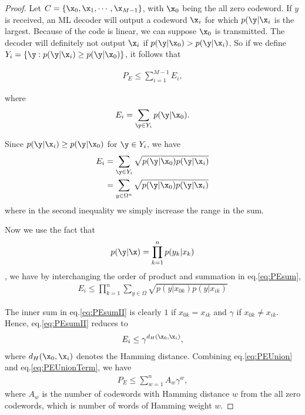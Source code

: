 \begin{proof}
    Let \(C=\{\x_0, \x_1, \cdots, \x_{M-1}\}\), with \(\x_0\) being the all zero codeword. If \(y\) is received, an ML decoder will output a codeword \(\x_i\) for which \(p(\y|\x_i\) is the largest. Because of the code is linear, we can suppose \(\x_0\) is transmitted. The decoder will definitely not output \(\x_i\) if \(p(\y|\x_0) > p(\y|\x_i)\). So if we define \(Y_i = \{\y: p(\y|\x_i) \geq p(\y|\x_0)\}\), it follows that 
    
    \begin{align}
        P_E \leq \sum_{i=1}^{M-1} E_i,
        \label{eq:PEUnion}
    \end{align}

    where 
    \begin{align*}
        E_i = \sum_{\y \in Y_i} p(\y|\x_0).   
    \end{align*}

    Since \(p(\y|\x_i) \geq p(\y|\x_0)\) for \(\y \in Y_i\), 
    we have
    \begin{align}
        E_i &= \sum_{\y \in Y_i} \sqrt{p(\y|\x_0)p(\y|\x_i)} \nonumber \\
        &= \sum_{y \in \Omega^n} \sqrt{p(\y|\x_0)p(\y|\x_i)}
        \label{eq:PEsum}
    \end{align}
    where in the second inequality we simply increase the range in the sum. 

    Now we use the fact that 
    \begin{align*}
        p(\y|\x) = \prod_{k=1}^n p(y_k|x_k)
    \end{align*}, 
    we have by interchanging the order of product and summation in eq.\ref{eq:PEsum}, 
    \begin{align}
        E_i \leq \prod_{k=1}^n \sum_{y \in \Omega} \sqrt{p(y|x_{0k})p(y|x_{ik})} \label{eq:PEsumII}
    \end{align}

    The inner sum in eq.\ref{eq:PEsumII} is clearly \(1\) if \(x_{0k} = x_{ik}\) and \(\gamma\) if \(x_{0k} \neq x_{ik}\). Hence, eq.\ref{eq:PEsumII} reduces to 
    \begin{align}
        E_i \leq \gamma^{d_{H}(\x_0, \x_i)},
        \label{eq:PEUnionTerm}
    \end{align}
    where \(d_{H}(\x_0, \x_i)\) denotes the Hamming distance. Combining eq.\ref{eq:PEUnion} and eq.\ref{eq:PEUnionTerm}, we have
    \begin{align*}
    P_E \leq \sum_{w=1}^n A_w \gamma^{w},
    \end{align*}
    where \(A_w\) is the number of codewords with Hamming distance \(w\) from the all zero codewords, which is number of words of Hamming weight \(w\). 
\end{proof}


